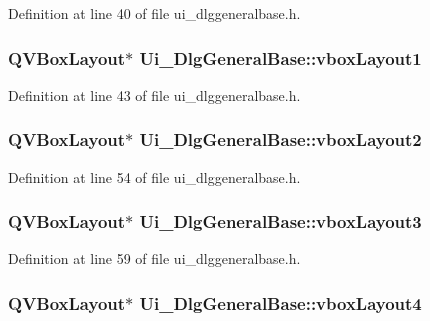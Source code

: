 Definition at line 40 of file ui\+\_\+dlggeneralbase.\+h.

\hypertarget{classUi__DlgGeneralBase_ada5c5c425bafcc272b9562c93ed886e8}{
\subsubsection[{vbox\+Layout1}]{\setlength{\rightskip}{0pt plus 5cm}Q\+V\+Box\+Layout$\ast$ Ui\+\_\+\+Dlg\+General\+Base\+::vbox\+Layout1}}\label{classUi__DlgGeneralBase_ada5c5c425bafcc272b9562c93ed886e8}


Definition at line 43 of file ui\+\_\+dlggeneralbase.\+h.

\hypertarget{classUi__DlgGeneralBase_aae73c98ee62ac66deae57632a9d82a4c}{
\subsubsection[{vbox\+Layout2}]{\setlength{\rightskip}{0pt plus 5cm}Q\+V\+Box\+Layout$\ast$ Ui\+\_\+\+Dlg\+General\+Base\+::vbox\+Layout2}}\label{classUi__DlgGeneralBase_aae73c98ee62ac66deae57632a9d82a4c}


Definition at line 54 of file ui\+\_\+dlggeneralbase.\+h.

\hypertarget{classUi__DlgGeneralBase_a457d320b774578a19aeb92dbe19f128e}{
\subsubsection[{vbox\+Layout3}]{\setlength{\rightskip}{0pt plus 5cm}Q\+V\+Box\+Layout$\ast$ Ui\+\_\+\+Dlg\+General\+Base\+::vbox\+Layout3}}\label{classUi__DlgGeneralBase_a457d320b774578a19aeb92dbe19f128e}


Definition at line 59 of file ui\+\_\+dlggeneralbase.\+h.

\hypertarget{classUi__DlgGeneralBase_a860af4a09b00b3bd9ab821e64a5aaa18}{
\subsubsection[{vbox\+Layout4}]{\setlength{\rightskip}{0pt plus 5cm}Q\+V\+Box\+Layout$\ast$ Ui\+\_\+\+Dlg\+General\+Base\+::vbox\+Layout4}}\label{classUi__DlgGeneralBase_a860af4a09b00b3bd9ab821e64a5aaa18}


